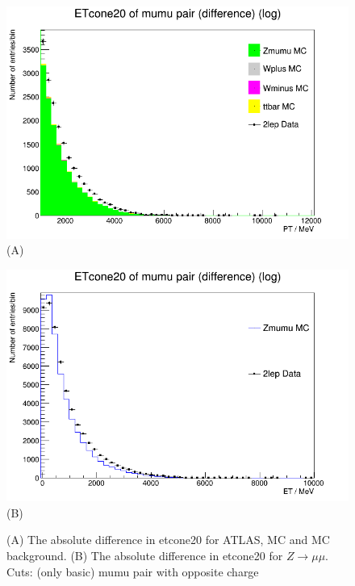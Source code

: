 \begin{figure}[h!]
    \centering
    \begin{minipage}{0.5\textwidth}
        \centering
        \includegraphics[width=\linewidth]{plots/27-02-2021/All-Stack-Zmumu-fast_etcone-difference_(basic-cuts_2lep=mumu_opp-c)_27-02-21_11-05.png}
        (A)
    \end{minipage}\hfill
    \begin{minipage}{0.5\textwidth}
        \centering
        \includegraphics[width=\linewidth]{plots/27-02-2021/2-Stack-Zmumu-fast_etcone-difference_(basic-cuts_2lep=mumu_opp-c)_27-02-21_11-05.png}
        (B)
    \end{minipage}
    \caption{(A) The absolute difference in etcone20 for ATLAS, MC and MC background. (B) The absolute difference in etcone20 for $Z \rightarrow \mu\mu$.  Cuts: (only basic) mumu pair with opposite charge }
    \label{fig:Stack-Zmumu-fast_etcone-difference_(basic-cuts_2lep=mumu_opp-c)_27-02-21_11-05}
\end{figure}




